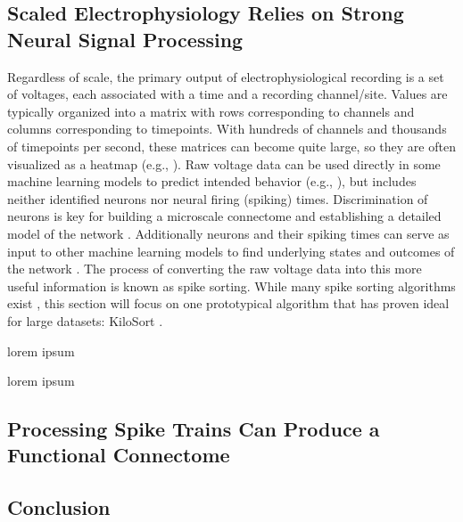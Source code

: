 \documentclass[11pt]{article}
\newcommand{\subsectionwithindent}[1]{
    \subsection*{#1}
    \hspace{\parindent} %
}
\begin{document}
\subsectionwithindent{Scaled Electrophysiology Relies on Strong Neural Signal Processing}
Regardless of scale, the primary output of electrophysiological recording is a set of voltages, each associated with a time and a recording channel/site. Values are typically organized into a matrix with rows corresponding to channels and columns corresponding to timepoints. With hundreds of channels and thousands of timepoints per second, these matrices can become quite large, so they are often visualized as a heatmap (e.g., \cite[Fig.~2A]{pachitariu2016kilosort}). Raw voltage data can be used directly in some machine learning models to predict intended behavior (e.g., \cite{musk2019integrated}), but includes neither identified neurons nor neural firing (spiking) times. Discrimination of neurons is key for building a microscale connectome and establishing a detailed model of the network \cite{jog2002tetrode,pachitariu2016kilosort}. Additionally neurons and their spiking times can serve as input to other machine learning models to find underlying states and outcomes of the network \cite{pandarinath2018autoencoders, keshtkaran2022large}. The process of converting the raw voltage data into this more useful information is known as spike sorting. While many spike sorting algorithms exist \cite{jog2002tetrode,pachitariu2016kilosort}, this section will focus on one prototypical algorithm that has proven ideal for large datasets: KiloSort \cite{pachitariu2016kilosort,pachitariu2024kilosort4}.

lorem ipsum

lorem ipsum


\subsectionwithindent{Processing Spike Trains Can Produce a Functional Connectome}


\subsectionwithindent{Conclusion}

\newpage
\printbibliography
\end{document}
